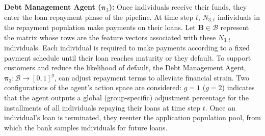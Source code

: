 \textbf{Debt Management Agent ($\boldsymbol{\pi}_3$):} Once individuals receive their funds, they enter the loan repayment phase of the pipeline. At time step $t$, $N_{3,t}$ individuals in the repayment population make payments on their loans. Let $\mathbf{B} \in \mathcal{B}$ represent the matrix whose rows are the feature vectors associated with these $N_{3,t}$ individuals. Each individual is required to make payments according to a fixed payment schedule until their loan reaches maturity or they default. To support customers and reduce the likelihood of default, the Debt Management Agent, $\boldsymbol{\pi}_3:\mathcal{B} \rightarrow [0,1]^{g}$, can adjust repayment terms to alleviate financial strain. Two configurations of the agent's action space are considered: $g=1$ ($g=2$) indicates that the agent outputs a global (group-specific) adjustment percentage for the installments of all individuals repaying their loans at time step $t$. Once an individual's loan is terminated, they reenter the application population pool, from which the bank samples individuals for future loans.

\begin{table}[t]
\caption{Loan MAFE Component Indicators}
\label{tab::Loan_indicators}
\centering
{}
\end{table}

